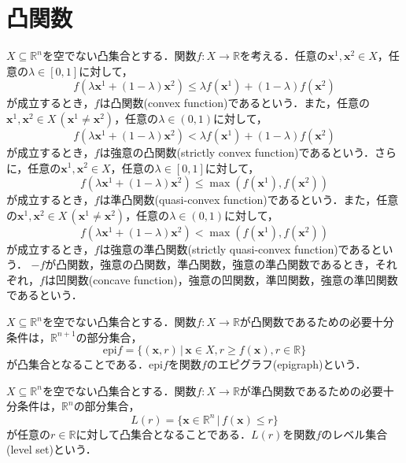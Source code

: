 \documentclass{jsreport}
\begin{document}
\section{凸関数}
$X \subseteq \mathbb{R}^n$を空でない凸集合とする．関数$f: X \rightarrow \mathbb{R}$を考える．任意の$\bm{x}^1, \bm{x}^2 \in X$，任意の$\lambda \in [0, 1]$に対して，
\begin{equation}
  f(\lambda \bm{x}^1 + (1 - \lambda)\bm{x}^2) \leq \lambda f(\bm{x}^1) + (1 - \lambda)f(\bm{x}^2) \nonumber
\end{equation}
が成立するとき，$f$は凸関数(convex function)であるという．また，任意の$\bm{x}^1, \bm{x}^2 \in X \, (\bm{x}^1 \neq \bm{x}^2)$，任意の$\lambda \in (0, 1)$に対して，
\begin{equation}
  f(\lambda \bm{x}^1 + (1 - \lambda)\bm{x}^2) < \lambda f(\bm{x}^1) + (1 - \lambda)f(\bm{x}^2) \nonumber
\end{equation}
が成立するとき，$f$は強意の凸関数(strictly convex function)であるという．さらに，任意の$\bm{x}^1, \bm{x}^2 \in X$，任意の$\lambda \in [0, 1]$に対して，
\begin{equation}
  f(\lambda\bm{x}^1 + (1 - \lambda)\bm{x}^2) \leq \max(f(\bm{x}^1), f(\bm{x}^2)) \nonumber
\end{equation}
が成立するとき，$f$は準凸関数(quasi-convex function)であるという．また，任意の$\bm{x}^1, \bm{x}^2 \in X \, (\bm{x}^1 \neq \bm{x}^2)$，任意の$\lambda \in (0, 1)$に対して，
\begin{equation}
  f(\lambda\bm{x}^1 + (1 - \lambda)\bm{x}^2) < \max(f(\bm{x}^1), f(\bm{x}^2)) \nonumber
\end{equation}
が成立するとき，$f$は強意の準凸関数(strictly quasi-convex function)であるという．
$-f$が凸関数，強意の凸関数，準凸関数，強意の準凸関数であるとき，それぞれ，$f$は凹関数(concave function)，強意の凹関数，準凹関数，強意の準凹関数であるという．

\begin{theo}\label{theo:epi}
  $X \subseteq \mathbb{R}^n$を空でない凸集合とする．関数$f: X \rightarrow \mathbb{R}$が凸関数であるための必要十分条件は，$\mathbb{R}^{n + 1}$の部分集合，
  \begin{equation}
    \mathrm{epi}f = \{(\bm{x}, r) \, | \, \bm{x} \in X, r \geq f(\bm{x}), r \in \mathbb{R}\} \nonumber
  \end{equation}
  が凸集合となることである．$\mathrm{epi}f$を関数$f$のエピグラフ(epigraph)という．
\end{theo}

\begin{theo}\label{theo:quasi}
  $X \subseteq \mathbb{R}^n$を空でない凸集合とする．関数$f: X \rightarrow \mathbb{R}$が準凸関数であるための必要十分条件は，$\mathbb{R}^{n}$の部分集合，
  \begin{equation}
    L(r) = \{\bm{x} \in \mathbb{R}^n \, | \, f(\bm{x}) \leq r \} \nonumber
  \end{equation}
  が任意の$r \in \mathbb{R}$に対して凸集合となることである．$L(r)$を関数$f$のレベル集合(level set)という．
\end{theo}
\end{document}
